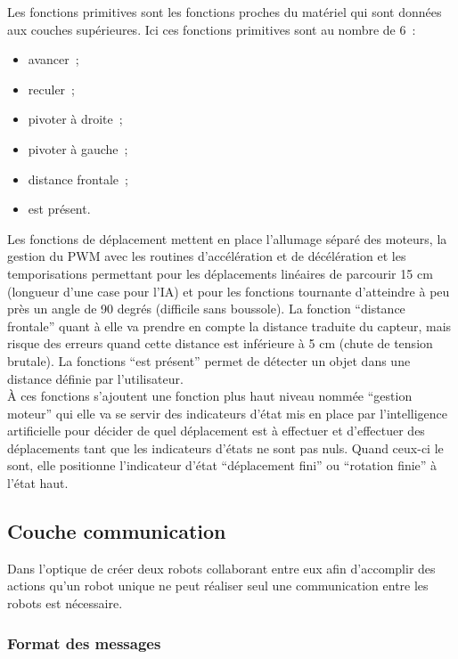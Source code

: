\documentclass{article}
\begin{document}
Les fonctions primitives sont les fonctions proches du matériel qui sont données aux couches supérieures. Ici ces fonctions primitives sont au nombre de 6~: \\

\begin{itemize}
  \item avancer~;
  \item reculer~;
  \item pivoter à droite~;
  \item pivoter à gauche~;
  \item distance frontale~;
  \item est présent. \\
\end{itemize}

Les fonctions de déplacement mettent en place l'allumage séparé des moteurs, la gestion du PWM avec les routines d'accélération et de décélération et les temporisations permettant pour les déplacements linéaires de parcourir 15 cm (longueur d'une case pour l'IA) et pour les fonctions tournante d'atteindre à peu près un angle de 90 degrés (difficile sans boussole). La fonction ``distance frontale'' quant à elle va prendre en compte la distance traduite du capteur, mais risque des erreurs quand cette distance est inférieure à 5 cm (chute de tension brutale). La fonctions ``est présent'' permet de détecter un objet dans une distance définie par l'utilisateur. \\

À ces fonctions s'ajoutent une fonction plus haut niveau nommée ``gestion moteur'' qui elle va se servir des indicateurs d'état mis en place par l'intelligence artificielle pour décider de quel déplacement est à effectuer et d'effectuer des déplacements tant que les indicateurs d'états ne sont pas nuls. Quand ceux-ci le sont, elle positionne l'indicateur d'état ``déplacement fini'' ou ``rotation finie'' à l'état haut.

\subsection{Couche communication}

Dans l'optique de créer deux robots collaborant entre eux afin d’accomplir des actions qu'un robot unique ne peut réaliser seul une communication entre les robots est nécessaire.

\subsubsection{Format des messages}
\end{document}
